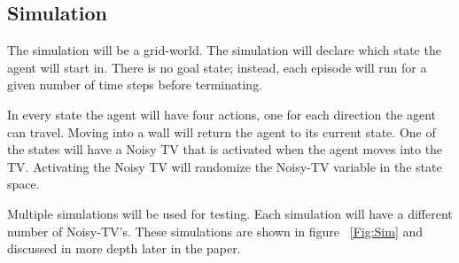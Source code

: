 \documentclass[12pt]{thesis}
\begin{document}
\subsection{Simulation}
The simulation will be a grid-world. The simulation will declare which state the agent will start in. There is no goal state; instead, each episode will run for a given number of time steps before terminating.

In every state the agent will have four actions, one for each direction the agent can travel. Moving into a wall will return the agent to its current state. One of the states will have a Noisy TV that is activated when the agent moves into the TV. Activating the Noisy TV will randomize the Noisy-TV variable in the state space.

Multiple simulations will be used for testing. Each simulation will have a different number of Noisy-TV's. These simulations are shown in figure 
\figurename~\ref{Fig:Sim} and discussed in more depth later in the paper.
\end{document}
